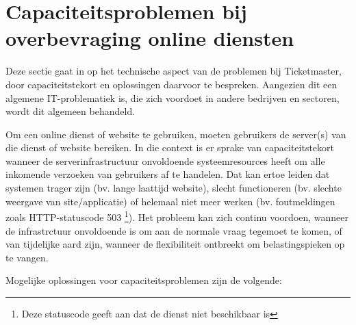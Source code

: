 
\section{Capaciteitsproblemen bij overbevraging online diensten}

Deze sectie gaat in op het technische aspect van de problemen bij Ticketmaster,
door capaciteitstekort en oplossingen daarvoor te bespreken. Aangezien dit
een algemene IT-problematiek is, die zich voordoet in andere bedrijven en
sectoren, wordt dit algemeen behandeld. 

Om een online dienst of website te gebruiken, moeten gebruikers de
server(s) van die dienst of website bereiken. In die context is er sprake van
capaciteitstekort wanneer de serverinfrastructuur onvoldoende systeemresources
heeft om alle inkomende verzoeken van gebruikers af te handelen.
Dat kan ertoe leiden dat systemen trager zijn (bv. lange laattijd website),
slecht functioneren (bv. slechte weergave van site/applicatie) of
helemaal niet meer werken (bv. foutmeldingen zoals HTTP-statuscode 503
\footnote{Deze statuscode geeft aan dat de dienst niet beschikbaar is}).
Het probleem kan zich continu voordoen, wanneer de infrastrctuur onvoldoende
is om aan de normale vraag tegemoet te komen,
of van tijdelijke aard zijn, wanneer de flexibiliteit ontbreekt om
belastingspieken op te vangen.

\newlinechar

Mogelijke oplossingen voor capaciteitsproblemen zijn de volgende:

